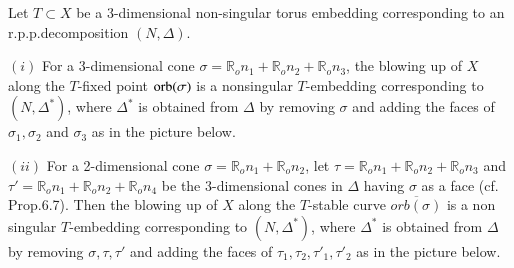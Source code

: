  \begin{coro}\label{chap1:coro7.6}%
Let $T \subset X$ be a 3-dimensional non-singular torus embedding
corresponding to an r.p.p.decomposition $(N , \Delta )$. 

\noindent
$(i)$ For a 3-dimensional cone $\sigma= \mathbb{R}_o n_1 +
\mathbb{R}_o n_2+ \mathbb{R}_o n_3$, the blowing up of $X$ along the
$T$-fixed point $\operatorname{orb}(\sigma)$ is a nonsingular $T$-embedding
corresponding to $(N, \Delta^*)$, where $\Delta^*$ is obtained from
$\Delta$ by removing $\sigma$ and adding the faces of $\sigma_1,
\sigma_2$ and $\sigma_3$ as in the picture below. 

\noindent
$(ii)$ For a 2-dimensional cone $\sigma= \mathbb{R}_o n_1 +
\mathbb{R}_o n_2$, let $\tau = \mathbb{R}_o n_1 + \mathbb{R}_o
n_2 +\mathbb{R}_o n_3$ and $\tau'=\mathbb{R}_o n_1+\mathbb{R}_o
n_2+\mathbb{R}_o n_4$ be the $3$-dimensional cones in $\Delta$ having
$\sigma$ as a face (cf. Prop.6.7). Then the blowing up of $X$ along
the $T$-stable curve $\overline{orb(\sigma)}$ is a non singular
$T$-embedding corresponding to $(N, \Delta^*)$, where $\Delta^*$ is
obtained from $\Delta$ by removing $\sigma , \tau, \tau'$ and adding
the faces of $\tau_1, \tau_2, \tau'_1, \tau'_2$ as in the picture
below. 



\end{coro}
